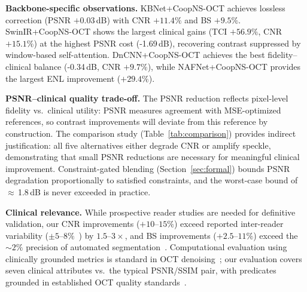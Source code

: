 \documentclass[journal,twoside,web]{ieeecolor}
\begin{document}
\textbf{Backbone-specific observations.} KBNet+CoopNS-OCT achieves lossless correction (PSNR $+0.03$\,dB) with CNR $+11.4\%$ and BS $+9.5\%$. SwinIR+CoopNS-OCT shows the largest clinical gains (TCI $+56.9\%$, CNR $+15.1\%$) at the highest PSNR cost (-1.69\,dB), recovering contrast suppressed by window-based self-attention. DnCNN+CoopNS-OCT achieves the best fidelity--clinical balance (-0.34\,dB, CNR $+9.7\%$), while NAFNet+CoopNS-OCT provides the largest ENL improvement ($+29.4\%$).

\textbf{PSNR--clinical quality trade-off.} The PSNR reduction reflects pixel-level fidelity vs.\ clinical utility: PSNR measures agreement with MSE-optimized references, so contrast improvements will deviate from this reference by construction. The comparison study (Table~\ref{tab:comparison}) provides indirect justification: all five alternatives either degrade CNR or amplify speckle, demonstrating that small PSNR reductions are necessary for meaningful clinical improvement. Constraint-gated blending (Section~\ref{sec:formal}) bounds PSNR degradation proportionally to satisfied constraints, and the worst-case bound of ${\approx}$\,1.8\,dB is never exceeded in practice.

\textbf{Clinical relevance.} While prospective reader studies are needed for definitive validation, our CNR improvements ($+10$--$15\%$) exceed reported inter-reader variability ($\pm 5$--$8\%$~\cite{stein2006quality}) by $1.5$--$3{\times}$, and BS improvements ($+2.5$--$11\%$) exceed the ${\sim}2\%$ precision of automated segmentation~\cite{devalla2018drunet}. Computational evaluation using clinically grounded metrics is standard in OCT denoising~\cite{geng2022triplet,fang2012sparsity,mayer2012wavelet}; our evaluation covers seven clinical attributes vs.\ the typical PSNR/SSIM pair, with predicates grounded in established OCT quality standards~\cite{stein2006quality,tewarie2012oscar}.
\end{document}
